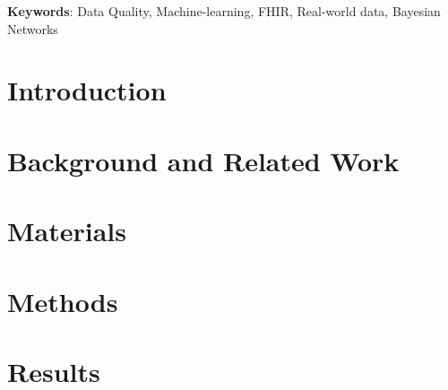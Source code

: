 \documentclass[]{article}
\begin{document}
\textbf{Keywords}: Data Quality, Machine-learning, FHIR, Real-world data, Bayesian Networks


%



%
%
%





%
%
\section{Introduction}


\section{Background and Related Work}


\section{Materials}


\section{Methods}


\section{Results}

\end{document}
